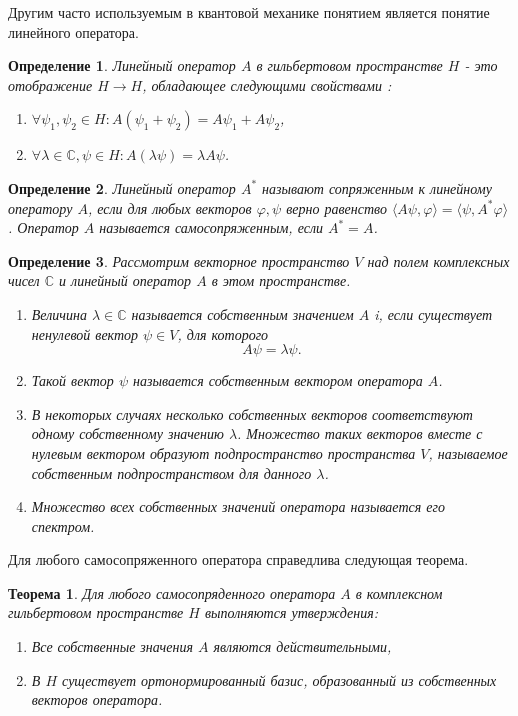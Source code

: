 \documentclass[%
master,         %
subf,           %
href,           %
colorlinks=true %
]{disser}
\numberwithin{equation}{section}
\numberwithin{figure}{section}
\newtheorem{theorem}{Теорема}[section]
\newtheorem{definition}{Определение}[section]
\begin{document}
Другим часто используемым в квантовой механике понятием является понятие линейного оператора.
\begin{definition}
Линейный оператор $A$ в гильбертовом пространстве $H$ - это отображение $H \to H$, обладающее следующими свойствами :
\begin{enumerate}
\item $\forall \psi_1,\psi_2\in H: A(\psi_1 + \psi_2) = A\psi_1 + A\psi_2 $,
\item $\forall\lambda\in\mathbb{C}, \psi\in H: A(\lambda\psi) = \lambda A\psi$.
\end{enumerate}
\end{definition}

\begin{definition}
Линейный оператор $A^*$ называют сопряженным к линейному оператору $A$, если для любых векторов $\varphi, \psi$ верно равенство $\langle A\psi,\varphi\rangle = \langle\psi, A^*\varphi\rangle$. Оператор $A$ называется самосопряженным, если $A^* = A$.
\end{definition}

\begin{definition}
Рассмотрим векторное пространство $V$ над полем комплексных чисел $\mathbb{C}$ и линейный оператор $A$ в этом пространстве.
\begin{enumerate}
\item Величина $\lambda\in \mathbb{C}$ называется собственным значением $A$ i, если существует ненулевой вектор $\psi\in V$, для которого
\[
A\psi = \lambda\psi.
\]
\item Такой вектор $\psi$ называется собственным вектором оператора $A$.
\item В некоторых случаях несколько собственных векторов соответствуют одному собственному значению $\lambda$. Множество таких векторов вместе с нулевым вектором образуют подпространство пространства $V$, называемое собственным подпространством для данного $\lambda$.
\item Множество всех собственных значений оператора называется его спектром.
\end{enumerate}
\end{definition}

Для любого самосопряженного оператора справедлива следующая теорема. 
\begin{theorem}
Для любого самосопряденного оператора $A$ в комплексном гильбертовом пространстве $H$ выполняются утверждения:
\begin{enumerate}
\item Все собственные значения $A$ являются действительными,
\item В $H$ существует ортонормированный базис, образованный из собственных векторов оператора.
\end{enumerate}
\end{theorem}
\end{document}
